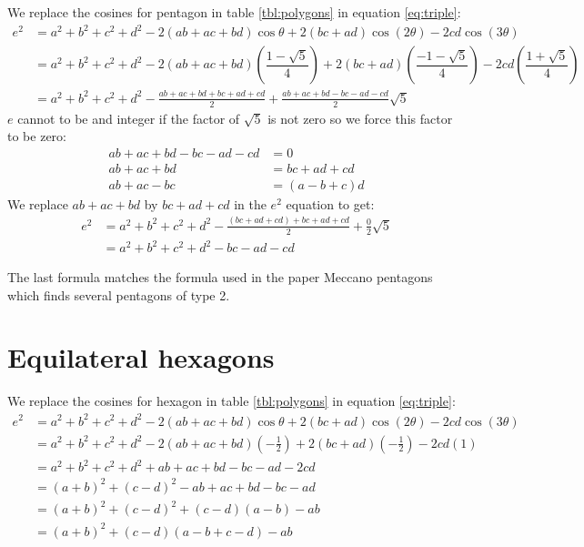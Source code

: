 \documentclass[11pt]{article}
\begin{document}
We replace the cosines for pentagon in table \ref{tbl:polygons} in equation \ref{eq:triple}:
\begin{align}
e^2 &= a^2 +b^2 +c^2 +d^2 -2(ab+ac+bd)\cos\theta +2(bc+ad)\cos(2\theta) -2cd\cos(3\theta) \nonumber\\
 &= a^2 +b^2 +c^2 +d^2
  -2(ab+ac+bd)\left(\dfrac{1-\sqrt{5}}{4}\right)
  +2(bc+ad)\left(\dfrac{-1-\sqrt{5}}{4}\right)
  -2cd\left(\dfrac{1+\sqrt{5}}{4}\right) \nonumber\\
 &= a^2 +b^2 +c^2 +d^2 -\frac{ab+ac+bd+bc+ad+cd}{2} +\frac{ab+ac+bd-bc-ad-cd}{2}\sqrt{5}
\end{align}
$e$ cannot to be and integer if the factor of $\sqrt{5}$ is not zero so we force this factor to be zero:
\begin{align}
 ab+ac+bd-bc-ad-cd &= 0\nonumber\\
 ab+ac+bd &= bc+ad+cd \\
 ab+ac-bc &= (a-b+c)d
\end{align}
We replace $ab+ac+bd$ by $bc+ad+cd$ in the $e^2$ equation to get:
\begin{align}
e^2 &= a^2 +b^2 +c^2 +d^2 -\frac{(bc+ad+cd)+bc+ad+cd}{2} +\frac{0}{2}\sqrt{5} \nonumber\\
 &= a^2 +b^2 +c^2 +d^2 -bc -ad -cd
\end{align}


The last formula matches the formula used in the paper Meccano pentagons which finds several pentagons of type 2. 


\section{Equilateral hexagons}

We replace the cosines for hexagon in table \ref{tbl:polygons} in equation \ref{eq:triple}:
\begin{align}
e^2 &= a^2 +b^2 +c^2 +d^2 -2(ab+ac+bd)\cos\theta +2(bc+ad)\cos(2\theta) -2cd\cos(3\theta) \nonumber\\
 &= a^2 +b^2 +c^2 +d^2 -2(ab+ac+bd)\left(-\frac{1}{2}\right) +2(bc+ad)\left(-\frac{1}{2}\right) -2cd(1) \nonumber\\
 &= a^2 +b^2 +c^2 +d^2 +ab+ac+bd -bc-ad-2cd \nonumber\\
 &= (a+b)^2 +(c-d)^2 -ab+ac+bd-bc-ad\nonumber\\
 &= (a+b)^2 +(c-d)^2 +(c-d)(a-b) -ab \nonumber\\
 &= (a+b)^2 +(c-d)(a-b+c-d) -ab
\end{align} 
\end{document}
